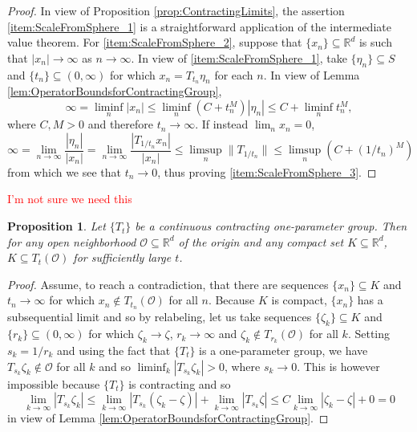 \documentclass[11pt]{article}
\theoremstyle{theorem}
\newtheorem{proposition}[theorem]{Proposition}
\begin{document}
\begin{proof}
In view of Proposition \ref{prop:ContractingLimits}, the assertion \ref{item:ScaleFromSphere_1} is a straightforward application of the intermediate value theorem. For \ref{item:ScaleFromSphere_2}, suppose that $\{x_n\}\subseteq\mathbb{R}^d$ is such that $|x_n|\rightarrow \infty$ as $n\rightarrow\infty$. In view of \ref{item:ScaleFromSphere_1}, take $\{\eta_n\}\subseteq S$ and $\{t_n\}\subseteq (0,\infty)$ for which $x_n=T_{t_n}\eta_n$ for each $n$. In view of Lemma \ref{lem:OperatorBoundsforContractingGroup},
\begin{equation*}
\infty=\liminf_n |x_n|\leq\liminf_n \left(C+t_n^M\right)|\eta_n|\leq C+\liminf_nt_n^M,
\end{equation*}
where $C,M>0$ and therefore $t_n\rightarrow\infty$. If instead $\lim_n x_n=0$,
\begin{equation*}
\infty=\lim_{n\rightarrow\infty}\frac{|\eta_n|}{|x_n|}=\lim_{n\rightarrow\infty}\frac{|T_{1/t_n}x_n|}{|x_n|}\leq\limsup_n\|T_{1/t_n}\|\leq\limsup_n(C+(1/t_n)^M)
\end{equation*}
from which we see that $t_n\rightarrow 0$, thus proving \ref{item:ScaleFromSphere_3}.
\end{proof}

\textcolor{red}{I'm not sure we need this}
\begin{proposition}\label{prop:ContractingCapturesCompact}
Let $\{T_t\}$ be a continuous contracting one-parameter group. Then for any open neighborhood $\mathcal{O}\subseteq\mathbb{R}^d$ of the origin and any compact set $K\subseteq\mathbb{R}^d$, $K\subseteq T_t(\mathcal{O})$ for sufficiently large $t$.
\end{proposition}
\begin{proof}
Assume, to reach a contradiction, that there are sequences $\{x_n\}\subseteq K$ and $t_n\rightarrow\infty$ for which $x_n\notin T_{t_n}(\mathcal{O})$ for all $n$. Because $K$ is compact, $\{x_n\}$ has a subsequential limit and so by relabeling, let us take sequences $\{\zeta_k\}\subseteq K$ and $\{r_k\}\subseteq (0,\infty)$ for which $\zeta_k\rightarrow \zeta$, $r_k\rightarrow\infty$ and $\zeta_k\notin T_{r_k}(\mathcal{O})$ for all $k$. Setting $s_k=1/r_k$ and using the fact that $\{T_t\}$ is a one-parameter group, we have $T_{s_k}\zeta_k\notin\mathcal{O}$ for all $k$ and so $\liminf_{k}|T_{s_k}\zeta_k|>0$, where $s_k\rightarrow 0$. This is however impossible because $\{T_t\}$ is contracting and so
\begin{equation*}
\lim_{k\rightarrow\infty}|T_{s_k}\zeta_k|\leq\lim_{k\rightarrow \infty}|T_{s_k}(\zeta_k-\zeta)|+\lim_{k\rightarrow\infty}|T_{s_k}\zeta|\leq C\lim_{k\rightarrow\infty}|\zeta_k-\zeta|+0=0
\end{equation*}
in view of Lemma \ref{lem:OperatorBoundsforContractingGroup}.
\end{proof}
\end{document}
